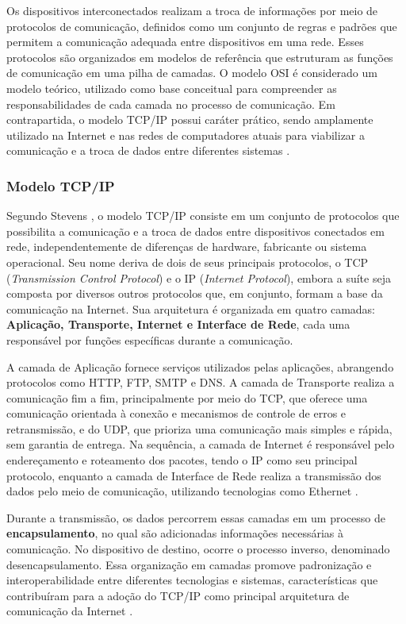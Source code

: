 \documentclass[
    12pt,                %
    openright,           %
    oneside,             %
    a4paper,             %
    english,             %
    brazil               %
]{abntex2}
\begin{document}
Os dispositivos interconectados realizam a troca de informações por meio de protocolos de comunicação, definidos como um conjunto de regras e padrões que permitem a comunicação adequada entre dispositivos em uma rede. Esses protocolos são organizados em modelos de referência que estruturam as funções de comunicação em uma pilha de camadas. O modelo OSI é considerado um modelo teórico, utilizado como base conceitual para compreender as responsabilidades de cada camada no processo de comunicação. Em contrapartida, o modelo TCP/IP possui caráter prático, sendo amplamente utilizado na Internet e nas redes de computadores atuais para viabilizar a comunicação e a troca de dados entre diferentes sistemas \cite{tanenbaum2011}.

\subsubsection{Modelo TCP/IP}

Segundo Stevens \cite{stevens1994}, o modelo TCP/IP consiste em um conjunto de protocolos que possibilita a comunicação e a troca de dados entre dispositivos conectados em rede, independentemente de diferenças de hardware, fabricante ou sistema operacional. Seu nome deriva de dois de seus principais protocolos, o TCP (\textit{Transmission Control Protocol}) e o IP (\textit{Internet Protocol}), embora a suíte seja composta por diversos outros protocolos que, em conjunto, formam a base da comunicação na Internet. Sua arquitetura é organizada em quatro camadas: \textbf{Aplicação, Transporte, Internet e Interface de Rede}, cada uma responsável por funções específicas durante a comunicação.

A camada de Aplicação fornece serviços utilizados pelas aplicações, abrangendo protocolos como HTTP, FTP, SMTP e DNS. A camada de Transporte realiza a comunicação fim a fim, principalmente por meio do TCP, que oferece uma comunicação orientada à conexão e mecanismos de controle de erros e retransmissão, e do UDP, que prioriza uma comunicação mais simples e rápida, sem garantia de entrega. Na sequência, a camada de Internet é responsável pelo endereçamento e roteamento dos pacotes, tendo o IP como seu principal protocolo, enquanto a camada de Interface de Rede realiza a transmissão dos dados pelo meio de comunicação, utilizando tecnologias como Ethernet \cite{stevens1994,esr2020}.

Durante a transmissão, os dados percorrem essas camadas em um processo de \textbf{encapsulamento}, no qual são adicionadas informações necessárias à comunicação. No dispositivo de destino, ocorre o processo inverso, denominado desencapsulamento. Essa organização em camadas promove padronização e interoperabilidade entre diferentes tecnologias e sistemas, características que contribuíram para a adoção do TCP/IP como principal arquitetura de comunicação da Internet \cite{stevens1994,esr2020}.
\end{document}
